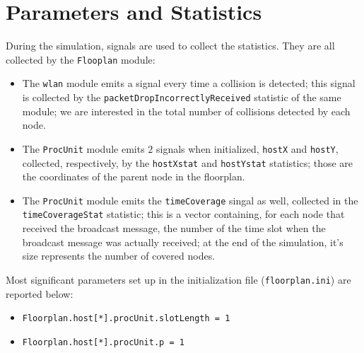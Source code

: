 \section{Parameters and Statistics}
During the simulation, signals are used to collect the statistics. They are all
collected by the \texttt{Flooplan} module:
\begin{itemize}
    \item The \texttt{wlan} module emits a signal every time a collision is
    detected; this signal is collected by the
    \texttt{packetDropIncorrectlyReceived} statistic of the same module; we are
    interested in the total number of collisions detected by each node.
    \item The \texttt{ProcUnit} module emits $2$ signals when initialized,
    \texttt{hostX} and \texttt{hostY}, collected, respectively, by the
    \texttt{hostXstat} and \texttt{hostYstat} statistics; those are the
    coordinates of the parent node in the floorplan.
    \item The \texttt{ProcUnit} module emits the \texttt{timeCoverage} singal as
    well, collected in the \texttt{timeCoverageStat} statistic; this is a
    vector containing, for each node that received the broadcast message, the
    number of the time slot when the broadcast message was actually received; at
    the end of the simulation, it's size represents the number of covered nodes.
\end{itemize}
Most significant parameters set up in the initialization file
(\texttt{floorplan.ini}) are reported below:
\begin{itemize}
    \item \texttt{Floorplan.host[*].procUnit.slotLength = 1}
    \item \texttt{Floorplan.host[*].procUnit.p = 1}
\end{itemize}
